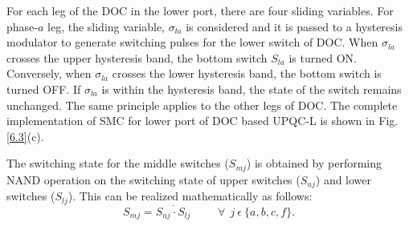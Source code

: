 For each leg of the DOC in the lower port, there are four sliding variables. For phase-$a$ leg, the sliding variable, $\sigma_{la}$ is considered and it is passed to a hysteresis modulator to generate switching pulses for the lower switch of DOC. When $\sigma_{la}$ crosses the upper hysteresis band, the bottom switch $S_{la}$ is turned ON. Conversely, when $\sigma_{la}$ crosses the lower hysteresis band, the bottom switch is turned OFF. If $\sigma_{la}$ is within the hysteresis band, the state of the switch remains unchanged. The same principle applies to the other legs of DOC. The complete implementation of SMC for lower port of DOC based UPQC-L is shown in Fig.\,\ref{6.3}(c). 

The switching state for the middle switches ($S_{mj}$) is obtained by performing NAND operation on the switching state of upper switches ($S_{uj}$) and lower switches ($S_{lj}$). This can be realized mathematically as follows:
\begin{equation} \label{6.13}
S_{mj} = \overline{S_{uj}\cdot S_{lj}} \hspace{1cm} \forall ~~ j ~ \epsilon ~ \{a,b,c,f\}.
\end{equation}

